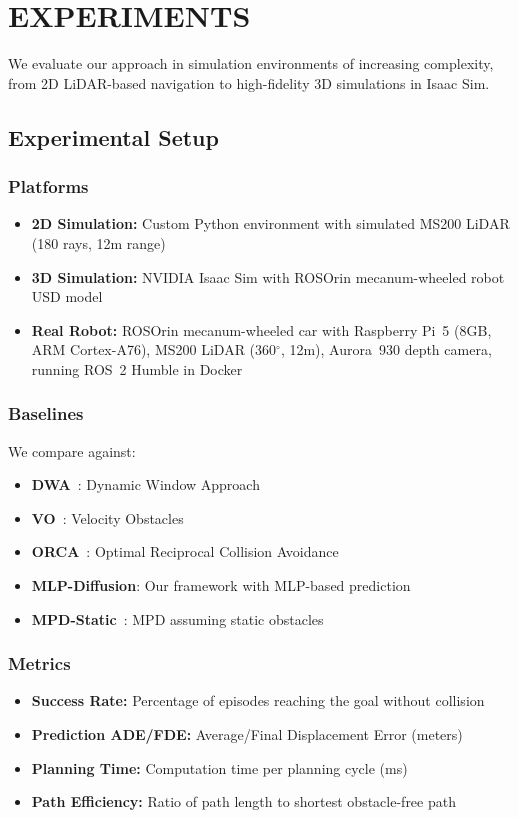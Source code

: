 \documentclass[letterpaper, 10 pt, conference]{ieeeconf}
\begin{document}
\section{EXPERIMENTS}

We evaluate our approach in simulation environments of increasing complexity, from 2D LiDAR-based navigation to high-fidelity 3D simulations in Isaac Sim.

\subsection{Experimental Setup}

\subsubsection{Platforms}
\begin{itemize}
    \item \textbf{2D Simulation:} Custom Python environment with simulated MS200 LiDAR (180 rays, 12m range)
    \item \textbf{3D Simulation:} NVIDIA Isaac Sim with ROSOrin mecanum-wheeled robot USD model
    \item \textbf{Real Robot:} ROSOrin mecanum-wheeled car with Raspberry Pi~5 (8GB, ARM Cortex-A76), MS200 LiDAR (360$^\circ$, 12m), Aurora~930 depth camera, running ROS~2 Humble in Docker
\end{itemize}

\subsubsection{Baselines}
We compare against:
\begin{itemize}
    \item \textbf{DWA}~\cite{fox1997dynamic}: Dynamic Window Approach
    \item \textbf{VO}~\cite{fiorini1998motion}: Velocity Obstacles
    \item \textbf{ORCA}~\cite{van2011reciprocal}: Optimal Reciprocal Collision Avoidance
    \item \textbf{MLP-Diffusion}: Our framework with MLP-based prediction
    \item \textbf{MPD-Static}~\cite{carvalho2023motion}: MPD assuming static obstacles
\end{itemize}

\subsubsection{Metrics}
\begin{itemize}
    \item \textbf{Success Rate:} Percentage of episodes reaching the goal without collision
    \item \textbf{Prediction ADE/FDE:} Average/Final Displacement Error (meters)
    \item \textbf{Planning Time:} Computation time per planning cycle (ms)
    \item \textbf{Path Efficiency:} Ratio of path length to shortest obstacle-free path
\end{itemize}
\end{document}
